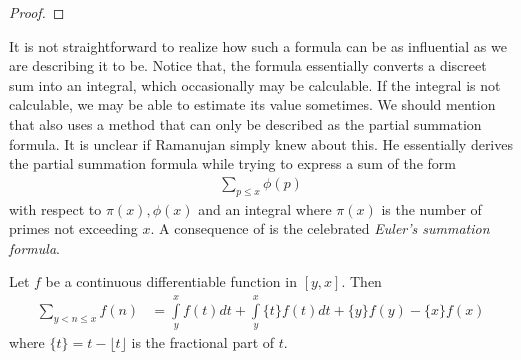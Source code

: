 \documentclass[elemannt.tex]{subfile}
\begin{document}
		\begin{proof}

		\end{proof}
	It is not straightforward to realize how such a formula can be as influential as we are describing it to be. Notice that, the formula essentially converts a discreet sum into an integral, which occasionally may be calculable. If the integral is not calculable, we may be able to estimate its value sometimes. We should mention that \textcite[Page $83$, $\S4$]{aiyangar_hardy_vennkatesvara_seshu_aiyar_p_wilson_1927} also uses a method that can only be described as the partial summation formula. It is unclear if Ramanujan simply knew about this. He essentially derives the partial summation formula while trying to express a sum of the form
		\begin{align*}
			\sum_{p\leq x}\phi(p)
		\end{align*}
	with respect to $\pi(x),\phi(x)$ and an integral where $\pi(x)$ is the number of primes not exceeding $x$. A consequence of  is the celebrated \textit{Euler's summation formula}.
		\begin{theorem}\label{thm:eulersum}
			Let $f$ be a continuous differentiable function in $[y,x]$. Then
				\begin{align*}
					\sum_{y<n\leq x}f(n)
						& = \int\limits_{y}^{x}f(t)dt+\int\limits_{y}^{x}\{t\}f(t)dt+\{y\}f(y)-\{x\}f(x)
				\end{align*}
			where $\{t\}=t-\lfloor{t}\rfloor$ is the fractional part of $t$.
		\end{theorem}
\end{document}
